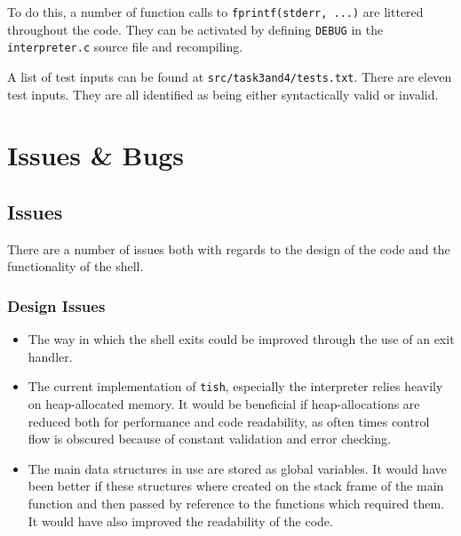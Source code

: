 \documentclass[12pt]{article}
\begin{document}
To do this, a number of function calls to
\texttt{fprintf(stderr, ...)} are littered throughout the code.
They can be activated by defining \texttt{DEBUG} in the
\texttt{interpreter.c} source file and recompiling.

\newpage



A list of test inputs can be found at
\texttt{src/task3and4/tests.txt}. There are eleven test inputs.
They are all identified as being either syntactically valid or
invalid.

\section{Issues \& Bugs}

\subsection{Issues}

There are a number of issues both with regards to the design of
the code and the functionality of the shell.

\subsubsection{Design Issues}

\begin{itemize}
\item
  The way in which the shell exits could be improved through the
  use of an exit handler.
\item
  The current implementation of \texttt{tish}, especially the
  interpreter relies heavily on heap-allocated memory. It would
  be beneficial if heap-allocations are reduced both for
  performance and code readability, as often times
  control flow is obscured because of constant validation and
  error checking.
\item
  The main data structures in use are stored as global
  variables. It would have been better if these structures where
  created on the stack frame of the main function and then
  passed by reference to the functions which required them. It
  would have also improved the readability of the code.
\end{itemize}
\end{document}
